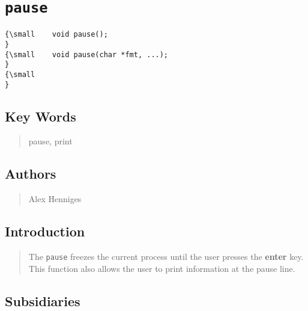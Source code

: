                       


\section*{\texttt{pause}}

\label{f0}

\begin{quotation}
{\small }
\end{quotation}

\begin{verbatim}
{\small    void pause();
}
{\small    void pause(char *fmt, ...);
}
{\small    
}
\end{verbatim}

\subsection*{Key Words}

\begin{quotation}
pause, print
\end{quotation}

\subsection*{Authors}

\begin{quotation}
Alex Henniges
\end{quotation}

\subsection*{Introduction}

\begin{quotation}
The \texttt{pause} freezes the current process until the user presses the 
\textbf{enter} key. This function also allows the user to print information
at the pause line.
\end{quotation}

\subsection*{Subsidiaries}

